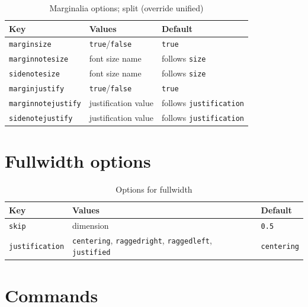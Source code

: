 \documentclass[11pt, twoside, openany]{book}
\begin{document}
\begin{table}[h]
	\caption{Marginalia options; split (override unified)}
	\label{tab:marginaliasplitselection}
	\centering
	\begin{tabular}{lll}
		\textbf{Key}               & \textbf{Values}              & \textbf{Default}               \\
		\hline
		\texttt{marginsize}        & \texttt{true}/\texttt{false} & \texttt{true}                  \\
		\texttt{marginnotesize}    & font size name               & follows \texttt{size}          \\
		\texttt{sidenotesize}      & font size name               & follows \texttt{size}          \\
		\texttt{marginjustify}     & \texttt{true}/\texttt{false} & \texttt{true}                  \\
		\texttt{marginnotejustify} & justification value          & follows \texttt{justification} \\
		\texttt{sidenotejustify}   & justification value          & follows \texttt{justification} \\
	\end{tabular}
\end{table}

\section{Fullwidth options}\label{sec:fulloptions}

\begin{table}
	\centering
	\caption{Options for fullwidth}
	\label{tab:fullwidthoptions}
	\begin{tabular}{lll}
		\textbf{Key}  & \textbf{Values} & \textbf{Default}                 \\
		\hline
		\texttt{skip} & dimension       & \texttt{0.5\string\baselineskip} \\
		\texttt{justification} & \texttt{centering}, \texttt{raggedright},
		\texttt{raggedleft}, \texttt{justified}
		& \texttt{centering} \\
	\end{tabular}
\end{table}

\section{Commands}\label{sec:commands}
\end{document}
